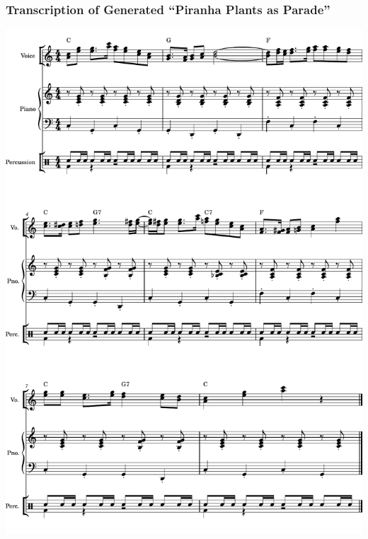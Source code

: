 \subsubsection{Transcription of Generated ``Piranha Plants as Parade''}
\label{sec:sheet_music_generated}
\begin{center}
	\includegraphics[width=6in]{materials/piranha_generated.pdf}
\end{center}

\clearpage

